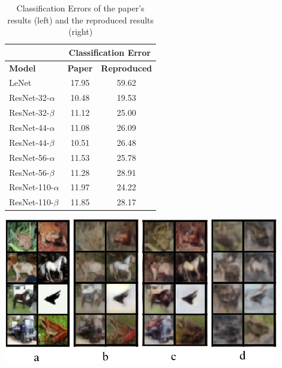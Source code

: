 \begin{table}
	\begin{minipage}{0.5\linewidth}
		\centering
		\captionsetup{justification=centering}
		\setlength{\abovecaptionskip}{5pt}
		\caption{Classification Errors of the paper's results (left) and the reproduced results (right)}
        \begin{tabular}{l|c|c}
        \hline
        \multicolumn{1}{c|}{} & \multicolumn{2}{|c}{Classification Error} \\
        \hline
        \textbf{Model} & \textbf{Paper} & \textbf{Reproduced} \\
        \hline
        LeNet & 17.95 & 59.62 \\
        ResNet-32-$\alpha$ & 10.48 & 19.53 \\
        ResNet-32-$\beta$ & 11.12 & 25.00 \\
        ResNet-44-$\alpha$ & 11.08 & 26.09 \\
        ResNet-44-$\beta$ & 10.51 & 26.48 \\
        ResNet-56-$\alpha$ & 11.53 & 25.78 \\
        ResNet-56-$\beta$ & 11.28 & 28.91 \\
        ResNet-110-$\alpha$ & 11.97 & 24.22 \\
        ResNet-110-$\beta$ & 11.85 & 28.17 \\
        \end{tabular}
        
        \label{accuracy-table}
	\end{minipage}\hfill
	\begin{minipage}{0.45\linewidth}
    	\centering
    	\setlength{\abovecaptionskip}{5pt}
        \includegraphics[width=0.9\textwidth]{../openreview/images/image_reconstructions.png}
        \label{fig:kanonymity}
	\end{minipage}
\end{table}

